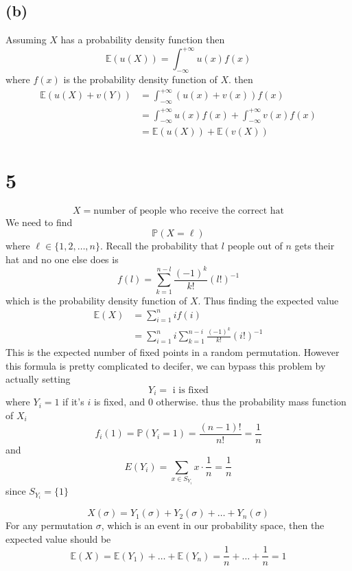 \documentclass[a4paper,11pt]{article}
\begin{document}
\subsection{(b)}
Assuming $X$ has a probability density function then 
$$
\mathbb{E}(u(X)) = \int_{-\infty}^{+\infty} u(x)f(x)
$$
where $f(x)$ is the probability density function of $X$.
then
\begin{align*}
	\mathbb{E}(u(X)+v(Y)) &= \int_{-\infty}^{+\infty} (u(x) + v(x))f(x) \\
			      &= \int_{-\infty}^{+\infty} u(x) f(x) +  \int_{-\infty}^{+\infty} v(x) f(x)\\
			      &= \mathbb{E}(u(X)) + \mathbb{E}(v(X))
\end{align*}
\clearpage
\section{5}
$$X = \text{number of people who receive the correct hat}$$
We need to find 
$$\mathbb{P}(X = \ell)$$ 
where $\ell \in \{1,2,\ldots,n\}$. Recall the probability that $l$ people out of $n$ gets their hat and no one else does is 
$$
f(l)=\sum_{k=1}^{n-l} \frac{(-1)^k}{k!}(l!)^{-1}
$$
which is the probability density function of $X$. Thus finding the expected value
\begin{align*}
	\mathbb{E}(X) &= \sum_{i = 1}^{n} i f(i)\\
		      &= \sum_{i=1}^n i \sum_{k=1}^{n-i} \frac{(-1)^k}{k!}(i!)^{-1}
\end{align*}
This is the expected number of fixed points in a random permutation. However this formula is pretty complicated to decifer, we can bypass this problem by actually setting
$$Y_i = \text{ i is fixed}$$ where $Y_i = 1$ if it's $i$ is fixed, and $0$ otherwise.
thus the probability mass function of $X_i$ 
$$f_i(1) = \mathbb{P}(Y_i = 1) = \frac{(n-1)!}{n!} = \frac{1}{n}$$
and 
$$E(Y_i) = \sum_{x \in S_{Y_i}} x \cdot \frac{1}{n} = \frac{1}{n}$$
since $S_{Y_i} = \{1\}$

$$X(\sigma) = Y_1(\sigma) + Y_2(\sigma) + \ldots + Y_n(\sigma)$$
For any permutation $\sigma$, which is an event in our probability space,
then the expected value should be
$$
\mathbb{E}(X) = \mathbb{E}(Y_1) + \ldots + \mathbb{E}(Y_n) = \frac{1}{n} + \ldots + \frac{1}{n} =  1
$$
\end{document}
